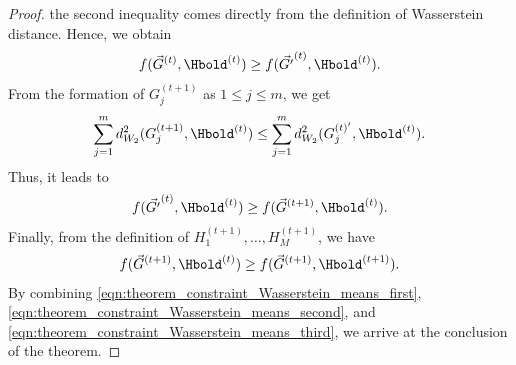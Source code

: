 \begin{proof}
the second inequality comes directly from the definition of Wasserstein distance. Hence, we obtain
\begin{eqnarray}
f(\vec{G}^{(t)},\Hbold^{(t)})\geq f(\vec{G'}^{(t)},\Hbold^{(t)}). \label{eqn:theorem_constraint_Wasserstein_means_first}
\end{eqnarray}
From the formation of $G_{j}^{(t+1)}$ as $1 \leq j \leq m$, we get
\begin{eqnarray}
\sum \limits_{j=1}^{m}{d_{W_{2}}^{2}(G_{j}^{(t+1)},\Hbold^{(t)})} \leq \sum \limits_{j=1}^{m}{d_{W_{2}}^{2}(G_{j}^{(t)'},\Hbold^{(t)})}. \nonumber
\end{eqnarray}
Thus, it leads to 
\begin{eqnarray}
f(\vec{G'}^{(t)},\Hbold^{(t)}) \geq f(\vec{G}^{(t+1)},\Hbold^{(t)}). \label{eqn:theorem_constraint_Wasserstein_means_second}
\end{eqnarray}
Finally, from the definition of $H_{1}^{(t+1)},\ldots,H_{M}^{(t+1)}$, we have
\begin{eqnarray}
f(\vec{G}^{(t+1)},\Hbold^{(t)}) \geq f(\vec{G}^{(t+1)},\Hbold^{(t+1)}). \label{eqn:theorem_constraint_Wasserstein_means_third}
\end{eqnarray}
By combining \eqref{eqn:theorem_constraint_Wasserstein_means_first}, \eqref{eqn:theorem_constraint_Wasserstein_means_second}, and \eqref{eqn:theorem_constraint_Wasserstein_means_third},  we arrive at the conclusion of the theorem.
\end{proof}
